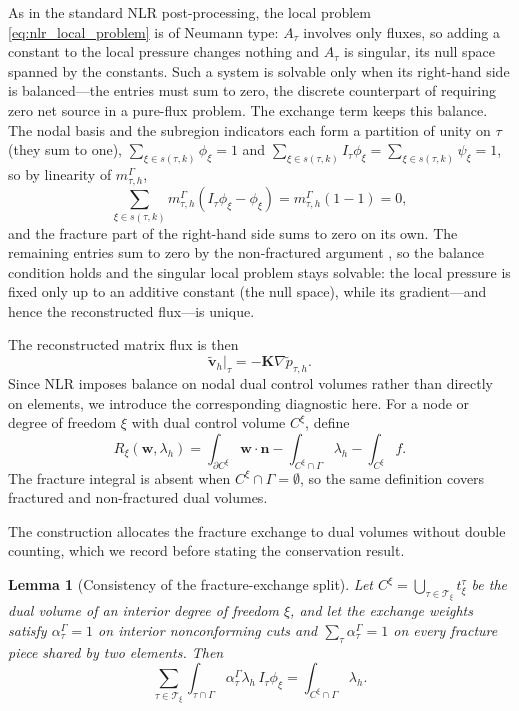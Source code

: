\documentclass[a4paper,fleqn]{cas-sc}
\newcommand{\Kmat}{\mathbf{K}}
\newcommand{\vflux}{\mathbf{v}}
\newtheorem{lemma}[theorem]{Lemma}
\begin{document}
As in the standard NLR post-processing, the local problem
\eqref{eq:nlr_local_problem} is of Neumann type: \(A_\tau\) involves only fluxes,
so adding a constant to the local pressure changes nothing and \(A_\tau\) is
singular, its null space spanned by the constants. Such a system is solvable only
when its right-hand side is balanced---the entries must sum to zero, the discrete
counterpart of requiring zero net source in a pure-flux problem. The exchange
term keeps this balance. The nodal basis and the subregion indicators each form a
partition of unity on \(\tau\) (they sum to one),
\(\sum_{\xi\in s(\tau,k)}\phi_\xi=1\) and
\(\sum_{\xi\in s(\tau,k)}I_\tau\phi_\xi=\sum_{\xi\in s(\tau,k)}\psi_\xi=1\), so by
linearity of \(m_{\tau,h}^\Gamma\),
\[
\sum_{\xi\in s(\tau,k)}
m_{\tau,h}^\Gamma(I_\tau\phi_\xi-\phi_\xi)
=
m_{\tau,h}^\Gamma(1-1)=0,
\]
and the fracture part of the right-hand side sums to zero on its own. The
remaining entries sum to zero by the non-fractured argument
\citep[Lemma~3.1]{DENG2019166}, so the balance condition holds and the singular
local problem stays solvable: the local pressure is fixed only up to an additive
constant (the null space), while its gradient---and hence the reconstructed
flux---is unique.

The reconstructed matrix flux is then
\begin{equation}
  \widetilde{\vflux}_h|_\tau
  =
  -\Kmat\nabla\widetilde p_{\tau,h}.
  \label{eq:nlr_reconstructed_flux}
\end{equation}
Since NLR imposes balance on nodal dual control volumes rather than directly
on elements, we introduce the corresponding diagnostic here. For a node or
degree of freedom \(\xi\) with dual control volume \(C^\xi\), define
\begin{equation}
R_\xi(\mathbf{w},\lambda_h)
=
\int_{\partial C^\xi}\mathbf{w}\cdot\mathbf{n}
-
\int_{C^\xi\cap\Gamma}\lambda_h
-
\int_{C^\xi} f .
\label{eq:dual_residual}
\end{equation}
The fracture integral is absent when \(C^\xi\cap\Gamma=\emptyset\), so the same
definition covers fractured and non-fractured dual volumes.

The construction allocates the fracture exchange to dual volumes without double
counting, which we record before stating the conservation result.

\begin{lemma}[Consistency of the fracture-exchange split]
\label{lem:exchange-consistency}
Let \(C^\xi=\bigcup_{\tau\in\mathcal{T}_\xi}t_\xi^\tau\) be the dual volume of an
interior degree of freedom \(\xi\), and let the exchange weights satisfy
\(\alpha_\tau^\Gamma=1\) on interior nonconforming cuts and
\(\sum_{\tau}\alpha_\tau^\Gamma=1\) on every fracture piece shared by two
elements. Then
\[
\sum_{\tau\in\mathcal{T}_\xi}
\int_{\tau\cap\Gamma}
\alpha_\tau^\Gamma\lambda_h\,I_\tau\phi_\xi
=
\int_{C^\xi\cap\Gamma}\lambda_h .
\]
\end{lemma}
\end{document}
